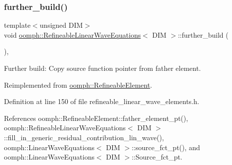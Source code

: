 \subsubsection{\texorpdfstring{further\+\_\+build()}{further\_build()}}
{\footnotesize\ttfamily template$<$unsigned D\+IM$>$ \\
void \hyperlink{classoomph_1_1RefineableLinearWaveEquations}{oomph\+::\+Refineable\+Linear\+Wave\+Equations}$<$ D\+IM $>$\+::further\+\_\+build (\begin{DoxyParamCaption}{ }\end{DoxyParamCaption})\hspace{0.3cm}{\ttfamily [inline]}, {\ttfamily [virtual]}}



Further build\+: Copy source function pointer from father element. 



Reimplemented from \hyperlink{classoomph_1_1RefineableElement_a26628ce36dfad028686adeb4694a9ef3}{oomph\+::\+Refineable\+Element}.



Definition at line 150 of file refineable\+\_\+linear\+\_\+wave\+\_\+elements.\+h.



References oomph\+::\+Refineable\+Element\+::father\+\_\+element\+\_\+pt(), oomph\+::\+Refineable\+Linear\+Wave\+Equations$<$ D\+I\+M $>$\+::fill\+\_\+in\+\_\+generic\+\_\+residual\+\_\+contribution\+\_\+lin\+\_\+wave(), oomph\+::\+Linear\+Wave\+Equations$<$ D\+I\+M $>$\+::source\+\_\+fct\+\_\+pt(), and oomph\+::\+Linear\+Wave\+Equations$<$ D\+I\+M $>$\+::\+Source\+\_\+fct\+\_\+pt.

\mbox{\label{classoomph_1_1RefineableLinearWaveEquations_a057892661a261b6959c3690f6b6e9a6a}} 
